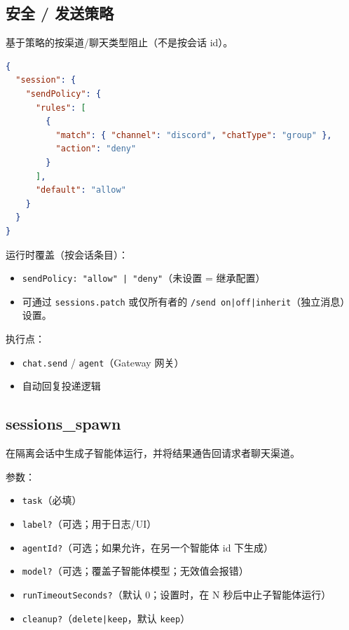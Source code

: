\subsection{安全 / 发送策略}


基于策略的按渠道/聊天类型阻止（不是按会话 id）。

\begin{lstlisting}[language=json]
{
  "session": {
    "sendPolicy": {
      "rules": [
        {
          "match": { "channel": "discord", "chatType": "group" },
          "action": "deny"
        }
      ],
      "default": "allow"
    }
  }
}
\end{lstlisting}


运行时覆盖（按会话条目）：

\begin{itemize}
  \item \texttt{sendPolicy: "allow" | "deny"}（未设置 = 继承配置）
  \item 可通过 \texttt{sessions.patch} 或仅所有者的 \texttt{/send on|off|inherit}（独立消息）设置。
\end{itemize}


执行点：

\begin{itemize}
  \item \texttt{chat.send} / \texttt{agent}（Gateway 网关）
  \item 自动回复投递逻辑
\end{itemize}


\subsection{sessions\_spawn}


在隔离会话中生成子智能体运行，并将结果通告回请求者聊天渠道。

参数：

\begin{itemize}
  \item \texttt{task}（必填）
  \item \texttt{label?}（可选；用于日志/UI）
  \item \texttt{agentId?}（可选；如果允许，在另一个智能体 id 下生成）
  \item \texttt{model?}（可选；覆盖子智能体模型；无效值会报错）
  \item \texttt{runTimeoutSeconds?}（默认 0；设置时，在 N 秒后中止子智能体运行）
  \item \texttt{cleanup?}（\texttt{delete|keep}，默认 \texttt{keep}）
\end{itemize}


